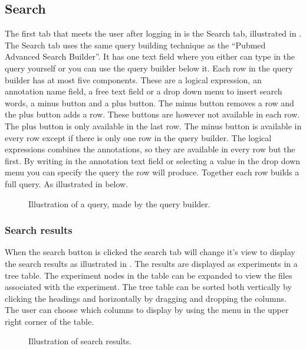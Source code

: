 \subsection{Search}
The first tab that meets the user after logging in is the Search tab, illustrated in . The Search tab uses the same query building technique as the “Pubmed Advanced Search Builder”\cite{des_pubmed_query}. It has one text field where you either can type in the query yourself or you can use the query builder below it. Each row in the query builder has at most five components. These are a logical expression, an annotation name field, a free text field or a drop down menu to insert search words, a minus button and a plus button. The minus button removes a row and the plus button adds a row. These buttons are however not available in each row. The plus button is only available in the last row. The minus button is available in every row except if there is only one row in the query builder. The logical expressions combines the annotations, so they are available in every row but the first.
By writing in the annotation text field or selecting a value in the drop down menu you can specify the query the row will produce. Together each row builds a full query. As illustrated in  below.
\begin{figure}[htb]
	\caption{Illustration of a query, made by the query builder.}
	\label{fig:des_search-query}
\end{figure}
\FloatBarrier
\subsubsection{Search results}
When the search button is clicked the search tab will change it's view to display the search results as illustrated in . The results are displayed as experiments in a tree table. The experiment nodes in the table can be expanded to view the files associated with the experiment. The tree table can be sorted both vertically by clicking the headings and horizontally by dragging and dropping the columns. The user can choose which columns to display by using the menu in the upper right corner of the table.

\begin{figure}[htb]
	\caption{Illustration of search results.}
	\label{fig:des_search-results}
\end{figure}


